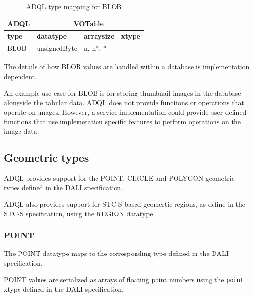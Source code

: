 \documentclass[11pt,a4paper]{ivoa}
\newcommand{\DALIspec}{DALI specification\xspace}
\newcommand{\STCSspec}{STC-S specification\xspace}
\begin{document}
\begin{table}[thm]\footnotesize
    \begin{tabular}
        {|p{}|p{}|p{}|p{}|}
        \hline

        \hline
        \multicolumn{1}{|c|}{\textbf{ADQL}} &
        \multicolumn{3}{|c|}{\textbf{VOTable}}
        \tabularnewline
        
        \hline
        \textbf{type} &
        \textbf{datatype} &
        \textbf{arraysize} &
        \textbf{xtype}
        \tabularnewline

        \hline
        BLOB &
        unsignedByte  &
        n, n*, * &
        -
        \tabularnewline

        \hline
    \end{tabular}
    \caption{ADQL type mapping for BLOB}
    \label{table:types.binary.blob}
\end{table}

The details of how BLOB values are handled within a
database is implementation dependent.

An example use case for BLOB is for storing thumbnail images
in the database alongside the tabular data.
ADQL does not provide functions or operations that operate on
images.
However, a service implementation could provide user defined
functions that use implemetation specific features to perform
operations on the image data.

\subsection{Geometric types}
\label{sec:types.geom}

ADQL provides support for the POINT, CIRCLE and POLYGON geometric
types defined in the \DALIspec.

ADQL also provides support for STC-S based geomertic regions,
as define in the \STCSspec, using the REGION datatype.

\subsubsection{POINT}
\label{sec:types.geom.point}

The POINT datatype maps to the corresponding type defined in the
\DALIspec.

POINT values are serialized as arrays of floating point numbers
using the \verb:point: xtype defined in the \DALIspec.
\end{document}
